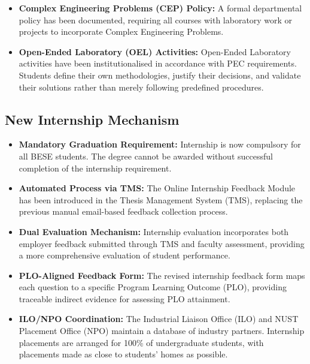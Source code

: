 \begin{itemize}[noitemsep, topsep=0pt]

    \item \textbf{Complex Engineering Problems (CEP) Policy:}
    A formal departmental policy has been documented, requiring
    all courses with laboratory work or projects to incorporate
    Complex Engineering Problems.

    \item \textbf{Open-Ended Laboratory (OEL) Activities:}
    Open-Ended Laboratory activities have been institutionalised
    in accordance with PEC requirements. Students define their
    own methodologies, justify their decisions, and validate
    their solutions rather than merely following predefined
    procedures.

\end{itemize}




\subsection{New Internship Mechanism}
\label{subsec:new-internship-mechanism}

\begin{itemize}[noitemsep, topsep=0pt]

    \item \textbf{Mandatory Graduation Requirement:}
    Internship is now compulsory for all BESE students.
    The degree cannot be awarded without successful completion
    of the internship requirement.

    \item \textbf{Automated Process via TMS:}
    The Online Internship Feedback Module has been introduced
    in the Thesis Management System (TMS), replacing the
    previous manual email-based feedback collection process.

    \item \textbf{Dual Evaluation Mechanism:}
    Internship evaluation incorporates both employer feedback
    submitted through TMS and faculty assessment, providing
    a more comprehensive evaluation of student performance.

    \item \textbf{PLO-Aligned Feedback Form:}
    The revised internship feedback form maps each question
    to a specific Program Learning Outcome (PLO), providing
    traceable indirect evidence for assessing PLO attainment.

    \item \textbf{ILO/NPO Coordination:}
    The Industrial Liaison Office (ILO) and NUST Placement
    Office (NPO) maintain a database of industry partners.
    Internship placements are arranged for 100\% of
    undergraduate students, with placements made as close
    to students' homes as possible.

\end{itemize}

